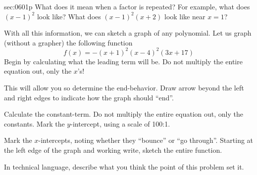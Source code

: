 \begin{multicols*}{2}
\begin{exercises}{sec:0601p}
\vspace{3cm}
\lab{} What does it mean when a factor is repeated?  For example, what does $(x-1)^2$ look like?  What does $(x-1)^2(x+2)$ look like near $x=1$?

\vspace{2cm}
\noindent
{}
\lab{} With all this information, we can sketch a graph of any polynomial.  Let us graph (without a grapher) the following function
$$
f(x) = -(x+1)^2(x-4)^2(3x+17)
$$
Begin by calculating what the leading term will be.  Do not multiply the entire equation out, only the $x$’s!

\vspace{1cm}
\lab{} This will allow you so determine the end-behavior.  Draw arrow beyond the left and right edges to indicate how the graph should ``end''.

\lab{} Calculate the constant-term.  Do not multiply the entire equation out, only the constants.  Mark the $y$-intercept, using a scale of 100:1.

\lab{} Mark the $x$-intercepts, noting whether they ``bounce'' or ``go through''.  Starting at the left edge of the graph and working write, sketch the entire function.

\lab{}  In technical language, describe what you think the point of this problem set it.
\end{exercises}
\end{multicols*}